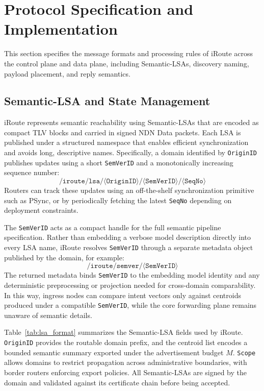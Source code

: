 \documentclass[conference]{IEEEtran}
\newcommand{\sysname}{iRoute}
\begin{document}
\section{Protocol Specification and Implementation}
\label{sec:spec}

This section specifies the message formats and processing rules of \sysname{} across the control plane and data plane, including Semantic-LSAs, discovery naming, payload placement, and reply semantics.

\subsection{Semantic-LSA and State Management}
\label{sec:spec_control}

\sysname{} represents semantic reachability using Semantic-LSAs that are encoded as compact TLV blocks and carried in signed NDN Data packets.
Each LSA is published under a structured namespace that enables efficient synchronization and avoids long, descriptive names.
Specifically, a domain identified by \texttt{OriginID} publishes updates using a short \texttt{SemVerID} and a monotonically increasing sequence number:
\[
\texttt{/iroute/lsa/}\langle\texttt{OriginID}\rangle\texttt{/}\langle\texttt{SemVerID}\rangle\texttt{/}\langle\texttt{SeqNo}\rangle
\]
Routers can track these updates using an off-the-shelf synchronization primitive such as PSync, or by periodically fetching the latest \texttt{SeqNo} depending on deployment constraints.

The \texttt{SemVerID} acts as a compact handle for the full semantic pipeline specification.
Rather than embedding a verbose model description directly into every LSA name, \sysname{} resolves \texttt{SemVerID} through a separate metadata object published by the domain, for example:
\[
\texttt{/iroute/semver/}\langle\texttt{SemVerID}\rangle
\]
The returned metadata binds \texttt{SemVerID} to the embedding model identity and any deterministic preprocessing or projection needed for cross-domain comparability.
In this way, ingress nodes can compare intent vectors only against centroids produced under a compatible \texttt{SemVerID}, while the core forwarding plane remains unaware of semantic details.

Table~\ref{tab:lsa_format} summarizes the Semantic-LSA fields used by \sysname{}.
\texttt{OriginID} provides the routable domain prefix, and the centroid list encodes a bounded semantic summary exported under the advertisement budget $M$.
\texttt{Scope} allows domains to restrict propagation across administrative boundaries, with border routers enforcing export policies.
All Semantic-LSAs are signed by the domain and validated against its certificate chain before being accepted.
\end{document}
